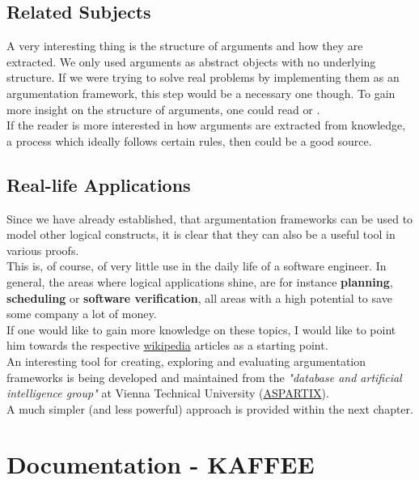 \documentclass[12pt]{report}
\numberwithin{figure}{chapter}
\theoremstyle{break}
\begin{document}
\section{Related Subjects}
A very interesting thing is the structure of arguments and how they are extracted. We only used arguments as abstract objects with no underlying structure. 
If we were trying to solve real problems by implementing them as an argumentation framework, this step would be a necessary one though.
To gain more insight on the structure of arguments, one could read \cite{HunterBesnard} or \cite{Prakken}.\\
If the reader is more interested in how arguments are extracted from knowledge, a process which ideally follows certain rules, then \cite{Pollock} could be a good source.

\newpage 

\section{Real-life Applications}
Since we have already established, that argumentation frameworks can be used to model other logical constructs, it is clear that they can also be a useful tool in various proofs.\\
This is, of course, of very little use in the daily life of a software engineer. In general, the areas where logical applications shine, are for instance \textbf{planning},
\textbf{scheduling} or \textbf{software verification}, all areas with a high potential to save some company a lot of money.\\
If one would like to gain more knowledge on these topics, I would like to point him towards the respective \href{http://en.wikipedia.org/}{wikipedia} articles as a starting point.\\
\medskip
An interesting tool for creating, exploring and evaluating argumentation frameworks is being developed and maintained from the \textit{"database and artificial intelligence group"}
at Vienna Technical University (\href{http://www.dbai.tuwien.ac.at/research/project/argumentation/}{ASPARTIX}).\\
A much simpler (and less powerful) approach is provided within the next chapter.

\chapter{Documentation - KAFFEE}
\end{document}
